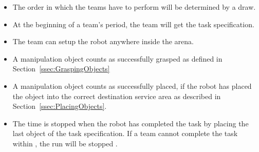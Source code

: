  \begin{itemize}
 \item The order in which the teams have to perform will be determined by a draw.
 \item At the beginning of a team’s period, the team will get the task specification.
 \item The team can setup the robot anywhere inside the arena.
 \item A manipulation object counts as successfully grasped as defined in Section~\ref{ssec:GraspingObjects}
 \item A manipulation object counts as successfully placed, if the robot has placed the object into the correct destination service area as described in Section~\ref{ssec:PlacingObjects}.
 \item {} The time is stopped when the robot has completed the task by placing the last object of the task specification. If a team cannot complete the task within , the run will be stopped .
 \end{itemize}

 
%
%
%
